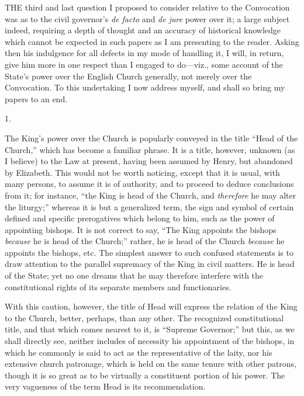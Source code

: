 
THE
third and last question I proposed to consider relative to the
Convocation was as to the civil governor's \emph{de facto} and \emph{de
jure} power over it; a large subject indeed, requiring a depth of
thought and an accuracy of historical knowledge which cannot be
expected in such papers as I am presenting to the reader. Asking then
his indulgence for all defects in my mode of handling it, I will, in
return, give him more in one respect than I engaged to do—viz., some
account of the State's power over the English Church generally, not
merely over the Convocation. To this undertaking I now address myself,
and shall so bring my papers to an end.

1.

The King's power over the
Church is popularly conveyed in the title ``Head of the Church,'' which
has become a familiar phrase. It is a title, however, unknown (as I
believe) to the Law at present, having been assumed by Henry, but
abandoned by Elizabeth. This would not be worth noticing, except that
it is usual, with many persons, to assume it is of authority, and to
proceed to deduce conclusions from it; for instance, ``the King is head
of the Church, and \emph{therefore} he may alter the liturgy;'' whereas
it is but a generalized term, the sign and symbol of certain defined
and specific prerogatives which belong to him, such as the power of
appointing bishops. It is not correct to say, ``The King appoints
the bishops \emph{because} he is head of the Church;'' rather, he is
head of the Church \emph{because} he appoints the bishops, etc. The
simplest answer to such confused statements is to draw attention to
the parallel supremacy of the King in civil matters. He is head of the
State; yet no one dreams that he may therefore interfere with the
constitutional rights of its separate members and functionaries.

With this caution, however,
the title of Head will express the relation of the King to the Church,
better, perhaps, than any other. The recognized constitutional title,
and that which comes nearest to it, is ``Supreme Governor;'' but this,
as we shall directly see, neither includes of necessity his
appointment of the bishops, in which he commonly is said to act as the
representative of the laity, nor his extensive church patronage, which
is held on the same tenure with other patrons, though it is so great
as to be virtually a constituent portion of his power. The very
vagueness of the term Head is its recommendation.

